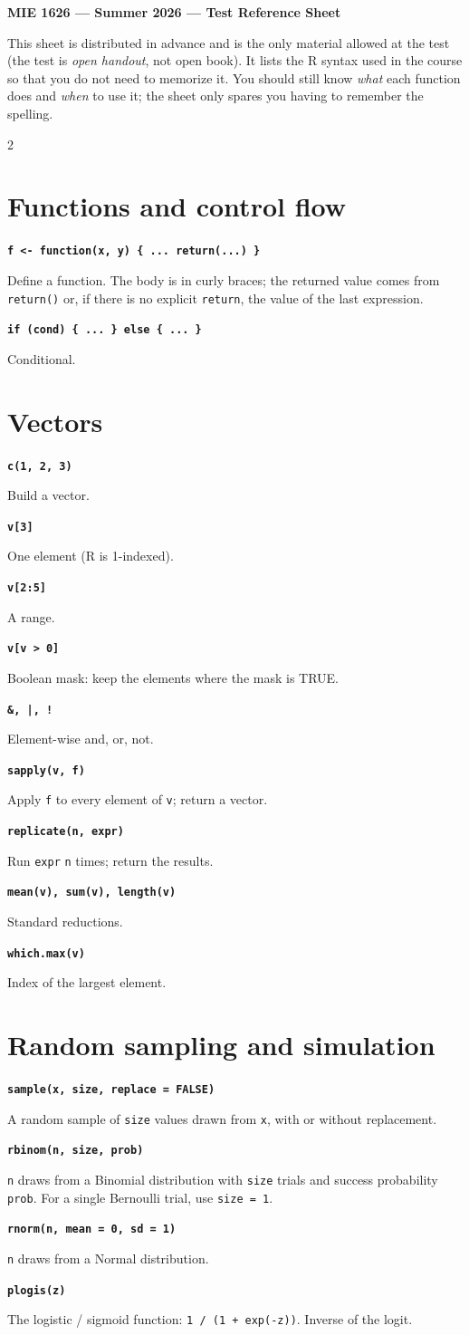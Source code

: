 \documentclass[10pt]{article}
\newcommand{\entry}[2]{%
  \par\medskip\noindent\textbf{\texttt{#1}}\par%
  \hspace*{1.5em}\parbox[t]{\dimexpr\linewidth-1.5em}{#2}\par%
}
\begin{document}
\begin{center}
  {\large\bfseries MIE 1626 --- Summer 2026 --- Test Reference Sheet}
\end{center}
\smallskip

This sheet is distributed in advance and is the only material allowed at the test
(the test is \emph{open handout}, not open book). It lists the R syntax used in
the course so that you do not need to memorize it. You should still know
\emph{what} each function does and \emph{when} to use it; the sheet only spares
you having to remember the spelling.

\begin{multicols}{2}

\section*{Functions and control flow}
\entry{f <- function(x, y) \{ ... return(...) \}}{Define a function. The body is in curly braces; the returned value comes from \texttt{return()} or, if there is no explicit \texttt{return}, the value of the last expression.}
\entry{if (cond) \{ ... \} else \{ ... \}}{Conditional.}

\section*{Vectors}
\entry{c(1, 2, 3)}{Build a vector.}
\entry{v[3]}{One element (R is 1-indexed).}
\entry{v[2:5]}{A range.}
\entry{v[v > 0]}{Boolean mask: keep the elements where the mask is TRUE.}
\entry{\&, |, !}{Element-wise and, or, not.}
\entry{sapply(v, f)}{Apply \texttt{f} to every element of \texttt{v}; return a vector.}
\entry{replicate(n, expr)}{Run \texttt{expr} \texttt{n} times; return the results.}
\entry{mean(v), sum(v), length(v)}{Standard reductions.}
\entry{which.max(v)}{Index of the largest element.}

\section*{Random sampling and simulation}
\entry{sample(x, size, replace = FALSE)}{A random sample of \texttt{size} values drawn from \texttt{x}, with or without replacement.}
\entry{rbinom(n, size, prob)}{\texttt{n} draws from a Binomial distribution with \texttt{size} trials and success probability \texttt{prob}. For a single Bernoulli trial, use \texttt{size = 1}.}
\entry{rnorm(n, mean = 0, sd = 1)}{\texttt{n} draws from a Normal distribution.}
\entry{plogis(z)}{The logistic / sigmoid function: \texttt{1 / (1 + exp(-z))}. Inverse of the logit.}


\end{multicols}
\end{document}
